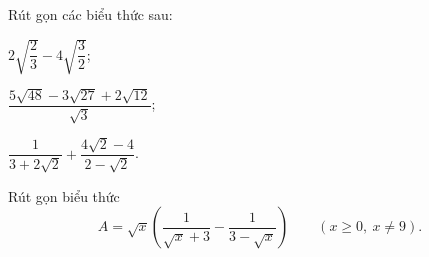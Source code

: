 \begin{exercises}
\begin{questions}[resume=SGK]
        \answerline
        \answerline

        \item Rút gọn các biểu thức sau:
        \begin{questions}
            \item $2\sqrt{\dfrac23}-4\sqrt{\dfrac32}$;
            \item $\dfrac{5\sqrt{48}-3\sqrt{27}+2\sqrt{12}}{\sqrt3}$;
            \item $\dfrac1{3+2\sqrt2}+\dfrac{4\sqrt2-4}{2-\sqrt2}$.
        \end{questions}

        \answerline
        \answerline

        \item Rút gọn biểu thức
        \[
            A=\sqrt x\left(\dfrac1{\sqrt x+3}-\dfrac1{3-\sqrt x}\right)
            \qquad (x\ge0,\ x\ne9).
        \]

        \answerline
        \answerline
    \end{questions}
\end{exercises}


